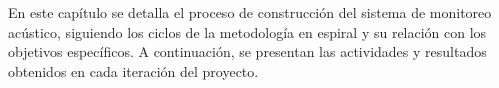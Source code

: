 
En este capítulo se detalla el proceso de construcción del sistema de monitoreo acústico, siguiendo los ciclos de la metodología en espiral y su relación con los objetivos específicos. A continuación, se presentan las actividades y resultados obtenidos en cada iteración del proyecto.


